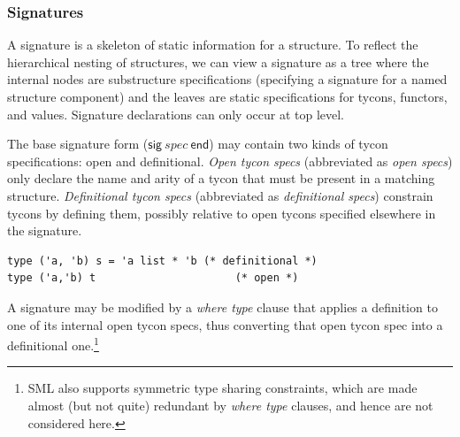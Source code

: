 \documentclass[9pt,nocopyrightspace, fleqn]{sigplanconf}
\begin{document}
\subsubsection{Signatures} 
A signature is a skeleton of static information for a structure. To
reflect the hierarchical nesting of structures, we can view a signature
as a tree where the internal nodes are substructure
specifications (specifying a signature for a named structure
component) and the leaves are static specifications for tycons,
functors, and values. Signature declarations can only occur at top level.


The base signature form ($\mathsf{sig}~spec~\mathsf{end}$) may contain
two kinds of tycon specifications: open and definitional.
\emph{Open tycon specs} (abbreviated as \emph{open specs}) only declare the
name and arity of a tycon that must be present in a matching
structure. \emph{Definitional tycon specs} (abbreviated as
\emph{definitional specs}) constrain tycons by defining them, possibly
relative to open tycons specified elsewhere in the signature.

\begin{lstlisting}
type ('a, 'b) s = 'a list * 'b (* definitional *)
type ('a,'b) t                      (* open *)
\end{lstlisting}

% 
A signature may be modified by a \emph{where type} clause that applies
a definition to one of its internal open tycon specs, thus converting
that open tycon spec into a definitional one.\footnote{SML also supports
symmetric type sharing constraints, which are made almost (but not quite)
redundant by \emph{where type} clauses, and hence are not considered here.}
\end{document}
